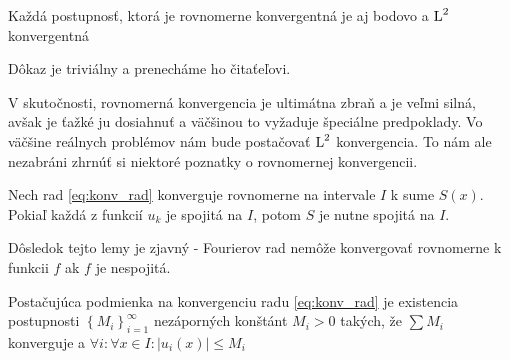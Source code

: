 \begin{lema}
    Každá postupnosť, ktorá je rovnomerne konvergentná je aj bodovo a
    $\mbox{L}^2$ konvergentná
\end{lema}
\begin{dokaz}
    Dôkaz je triviálny a prenecháme ho čitaťeľovi.
\end{dokaz}

V skutočnosti, rovnomerná konvergencia je ultimátna zbraň a je veľmi
silná, avšak je ťažké ju dosiahnuť a väčšinou to vyžaduje špeciálne
predpoklady. Vo väčšine reálnych problémov nám bude postačovať
$\mbox{L}^2$ konvergencia. To nám ale nezabráni zhrnúť si
niektoré poznatky o rovnomernej konvergencii.

\begin{lema}
    Nech rad \ref{eq:konv_rad} konverguje rovnomerne na intervale $I$
    k sume $S(x)$. Pokiaľ každá z funkcií $u_k$ je spojitá na $I$,
    potom $S$ je nutne spojitá na $I$.
\end{lema}

Dôsledok tejto lemy je zjavný - Fourierov rad nemôže konvergovať
rovnomerne k funkcii $f$ ak $f$ je nespojitá.

\begin{lema}
  Postačujúca podmienka na konvergenciu radu \ref{eq:konv_rad}
  je existencia postupnosti $\left\{M_i\right\}_{i=1}^\infty$
  nezáporných konštánt $M_i>0$ takých, že
  $\sum M_i$ konverguje a $\forall i: \forall x\in I: |u_i(x)|\le M_i$
\end{lema}

